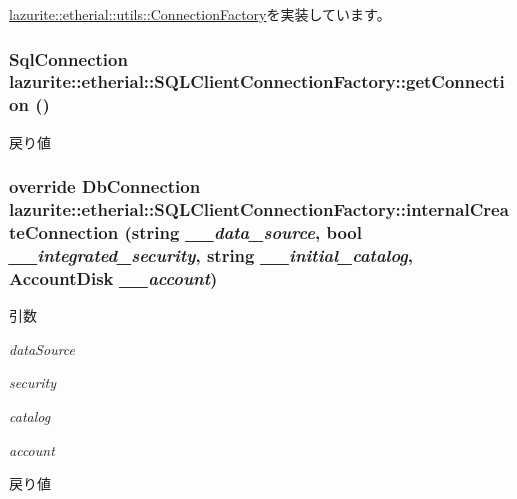 \hyperlink{classlazurite_1_1etherial_1_1utils_1_1_connection_factory_a5980a0a44f55a60cf4b991920d7f8529}{lazurite::etherial::utils::ConnectionFactory}を実装しています。\hypertarget{classlazurite_1_1etherial_1_1_s_q_l_client_connection_factory_a1c36f41c524ba9513f12e796bc84cf48}{
\subsubsection[{getConnection}]{\setlength{\rightskip}{0pt plus 5cm}SqlConnection lazurite::etherial::SQLClientConnectionFactory::getConnection ()}}
\label{classlazurite_1_1etherial_1_1_s_q_l_client_connection_factory_a1c36f41c524ba9513f12e796bc84cf48}
\begin{DoxyReturn}{戻り値}

\end{DoxyReturn}
\hypertarget{classlazurite_1_1etherial_1_1_s_q_l_client_connection_factory_a36d7093be17f200a15c05bf63fd1eeb1}{
\subsubsection[{internalCreateConnection}]{\setlength{\rightskip}{0pt plus 5cm}override DbConnection lazurite::etherial::SQLClientConnectionFactory::internalCreateConnection (string {\em \_\-\_\-data\_\-source}, \/  bool {\em \_\-\_\-integrated\_\-security}, \/  string {\em \_\-\_\-initial\_\-catalog}, \/  {\bf AccountDisk} {\em \_\-\_\-account})}}
\label{classlazurite_1_1etherial_1_1_s_q_l_client_connection_factory_a36d7093be17f200a15c05bf63fd1eeb1}

\begin{DoxyParams}{引数}
\item[{\em dataSource}]\item[{\em security}]\item[{\em catalog}]\item[{\em account}]\end{DoxyParams}
\begin{DoxyReturn}{戻り値}

\end{DoxyReturn}


